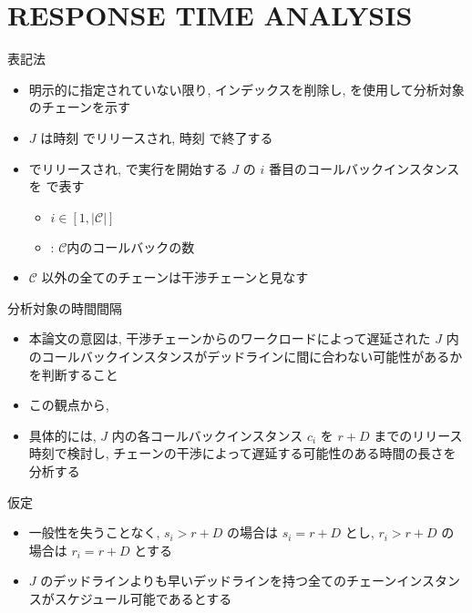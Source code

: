 

\section{RESPONSE TIME ANALYSIS}
\label{sec: responce_time_analysis}


\begin{frame}{表記法}
    \begin{itemize}
        \item 明示的に指定されていない限り, インデックスを削除し,  を使用して分析対象のチェーンを示す
        \item $J$ は時刻  でリリースされ, 時刻  で終了する
        \item {} でリリースされ,  で実行を開始する $J$ の $i$ 番目のコールバックインスタンスを  で表す
              \begin{itemize}
                  \item $i\in[1,|\mathcal{C}|]$
                  \item {}: $\mathcal{C}$内のコールバックの数
              \end{itemize}
        \item $\mathcal{C}$ 以外の全てのチェーンは干渉チェーンと見なす
    \end{itemize}
\end{frame}

\begin{frame}{分析対象の時間間隔}
    \begin{itemize}
        \item 本論文の意図は, 干渉チェーンからのワークロードによって遅延された $J$ 内のコールバックインスタンスがデッドラインに間に合わない可能性があるかを判断すること
        \item この観点から, \tu{時間間隔 $\left[r, \min \left\{s_{|\mathcal{C}|}, r+D\right\}\right)$ を $J$ の\al{問題ウィンドウ}とし,}\\ 
        \item 具体的には, $J$ 内の各コールバックインスタンス $c_{i}$ を $r+D$ までのリリース時刻で検討し, チェーンの干渉によって遅延する可能性のある時間の長さを分析する
    \end{itemize}
\end{frame}

\begin{frame}{仮定}
    \begin{itemize}
        \item 一般性を失うことなく, $s_{i}>r+D$ の場合は $s_{i}=r+D$ とし, $r_{i}>r+D$ の場合は $r_{i}=r+D$ とする
        \item $J$ のデッドラインよりも早いデッドラインを持つ全てのチェーンインスタンスがスケジュール可能であるとする 
    \end{itemize}
\end{frame}

